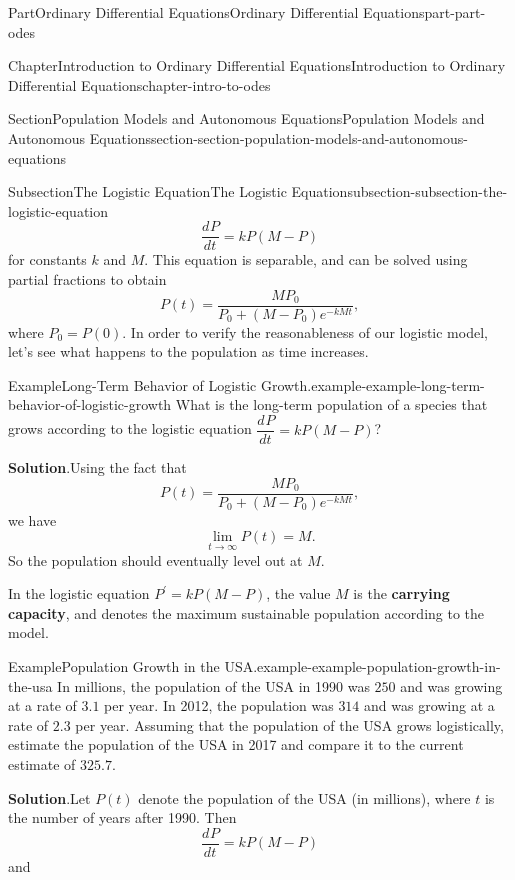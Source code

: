 \documentclass[twoside,10pt,]{book}
\newcommand{\blocktitlefont}{\relax}
\newcommand{\terminology}[1]{\textbf{#1}}
\numberwithin{equation}{part}
\newcommand{\dv}[3][]{\dfrac{d^{#1} #2}{d #3^{#1}}}
\begin{document}
\begin{partptx}{Part}{Ordinary Differential Equations}{}{Ordinary Differential Equations}{}{}{part-part-odes}
\begin{chapterptx}{Chapter}{Introduction to Ordinary Differential Equations}{}{Introduction to Ordinary Differential Equations}{}{}{chapter-intro-to-odes}
\begin{sectionptx}{Section}{Population Models and Autonomous Equations}{}{Population Models and Autonomous Equations}{}{}{section-section-population-models-and-autonomous-equations}
\begin{subsectionptx}{Subsection}{The Logistic Equation}{}{The Logistic Equation}{}{}{subsection-subsection-the-logistic-equation}
\begin{equation*}
\dv{P}{t} = kP(M-P)
\end{equation*}
for constants \(k\) and \(M\). This equation is separable, and can be solved using partial fractions to obtain%
\begin{equation*}
P(t) = \frac{MP_{0}}{P_{0} + (M - P_{0})e^{-kMt}},
\end{equation*}
where \(P_{0} = P(0)\). In order to verify the reasonableness of our logistic model, let's see what happens to the population as time increases.%
\begin{example}{Example}{Long-Term Behavior of Logistic Growth.}{example-example-long-term-behavior-of-logistic-growth}%
What is the long-term population of a species that grows according to the logistic equation \(\dv{P}{t} = kP(M-P)\)?%
\par\smallskip%
\noindent\textbf{\blocktitlefont Solution}.\hypertarget{solution-example-long-term-behavior-of-logistic-growth-c}{}\quad{}Using the fact that%
\begin{equation*}
P(t) = \frac{MP_{0}}{P_{0} + (M - P_{0})e^{-kMt}},
\end{equation*}
we have%
\begin{equation*}
\lim_{t\to\infty}P(t) = M.
\end{equation*}
So the population should eventually level out at \(M\).%
\end{example}
In the logistic equation \(P^\prime = kP(M-P)\), the value \(M\) is the \terminology{carrying capacity}, and denotes the maximum sustainable population according to the model.%
\begin{example}{Example}{Population Growth in the USA.}{example-example-population-growth-in-the-usa}%
In millions, the population of the USA in 1990 was \(250\) and was growing at a rate of \(3.1\) per year. In 2012, the population was \(314\) and was growing at a rate of \(2.3\) per year. Assuming that the population of the USA grows logistically, estimate the population of the USA in 2017 and compare it to the current estimate of \(325.7\).%
\par\smallskip%
\noindent\textbf{\blocktitlefont Solution}.\hypertarget{solution-example-population-growth-in-the-usa-c}{}\quad{}Let \(P(t)\) denote the population of the USA (in millions), where \(t\) is the number of years after 1990. Then%
\begin{equation*}
\dv{P}{t} = kP(M-P)
\end{equation*}
and%
\begin{equation*}

\end{equation*}
\end{example}
\end{subsectionptx}
\end{sectionptx}
\end{chapterptx}
\end{partptx}
\end{document}
